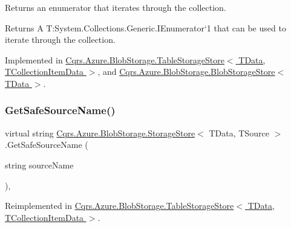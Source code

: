 Returns an enumerator that iterates through the collection. 

\begin{DoxyReturn}{Returns}
A T\+:\+System.\+Collections.\+Generic.\+I\+Enumerator`1 that can be used to iterate through the collection. 
\end{DoxyReturn}


Implemented in \hyperlink{classCqrs_1_1Azure_1_1BlobStorage_1_1TableStorageStore_ac3e684b894e739f8936e537806952c49_ac3e684b894e739f8936e537806952c49}{Cqrs.\+Azure.\+Blob\+Storage.\+Table\+Storage\+Store$<$ T\+Data, T\+Collection\+Item\+Data $>$}, and \hyperlink{classCqrs_1_1Azure_1_1BlobStorage_1_1BlobStorageStore_a7b106644bd8bfe5b1b5e5ef7bc279769_a7b106644bd8bfe5b1b5e5ef7bc279769}{Cqrs.\+Azure.\+Blob\+Storage.\+Blob\+Storage\+Store$<$ T\+Data $>$}.

\mbox{\label{classCqrs_1_1Azure_1_1BlobStorage_1_1StorageStore_a3ed119d808d9b29e99b1c6c983831482_a3ed119d808d9b29e99b1c6c983831482}} 
\subsubsection{\texorpdfstring{Get\+Safe\+Source\+Name()}{GetSafeSourceName()}\hspace{0.1cm}{\footnotesize\ttfamily [1/2]}}
{\footnotesize\ttfamily virtual string \hyperlink{classCqrs_1_1Azure_1_1BlobStorage_1_1StorageStore}{Cqrs.\+Azure.\+Blob\+Storage.\+Storage\+Store}$<$ T\+Data, T\+Source $>$.Get\+Safe\+Source\+Name (\begin{DoxyParamCaption}\item[{string}]{source\+Name }\end{DoxyParamCaption})\hspace{0.3cm}{\ttfamily [protected]}, {\ttfamily [virtual]}}



Reimplemented in \hyperlink{classCqrs_1_1Azure_1_1BlobStorage_1_1TableStorageStore_a7b9e49aa8017ff3c55b184b956a150d0_a7b9e49aa8017ff3c55b184b956a150d0}{Cqrs.\+Azure.\+Blob\+Storage.\+Table\+Storage\+Store$<$ T\+Data, T\+Collection\+Item\+Data $>$}.

